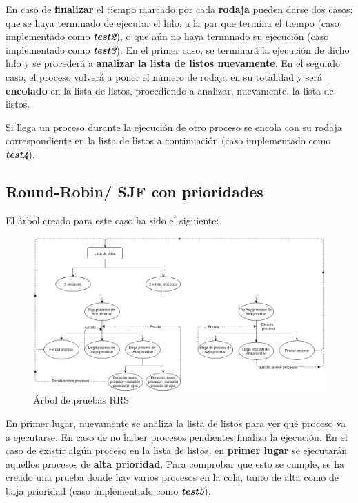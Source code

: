 \documentclass[10pt, spanish, pdftex]{template/UC3M_document}
\begin{document}
En caso de \textbf{finalizar} el tiempo marcado por cada \textbf{rodaja} pueden darse dos casos: que se haya terminado de ejecutar el hilo, a la par que termina el tiempo (caso implementado como \textbf{\textit{test2}}), o que aún no haya terminado su ejecución (caso implementado como \textbf{\textit{test3}}). En el primer caso, se terminará la ejecución de dicho hilo y se procederá a \textbf{analizar la lista de listos nuevamente}. En el segundo caso, el proceso volverá a poner el número de rodaja en su totalidad y será \textbf{encolado} en la lista de listos, procediendo a analizar, nuevamente, la lista de listos.

Si llega un proceso durante la ejecución de otro proceso se encola con su rodaja correspondiente en la lista de listos a continuación (caso implementado como \textbf{\textit{test4}}).

\subsection{Round-Robin/ SJF con prioridades}
El árbol creado para este caso ha sido el siguiente:
\vspace{0.5cm}
\begin{figure}[h]
    \centering
    \includegraphics[width=14cm]{arboles/RRS.png}
    \caption{Árbol de pruebas RRS}
\end{figure}

En primer lugar, nuevamente se analiza la lista de listos para ver qué proceso va a ejecutarse. En caso de no haber procesos pendientes finaliza la ejecución. En el caso de existir algún proceso en la lista de listos, en \textbf{primer lugar} se ejecutarán aquellos procesos de \textbf{alta prioridad}. Para comprobar que esto se cumple, se ha creado una prueba donde hay varios procesos en la cola, tanto de alta como de baja prioridad (caso implementado como \textbf{\textit{test5}}). 
\end{document}
